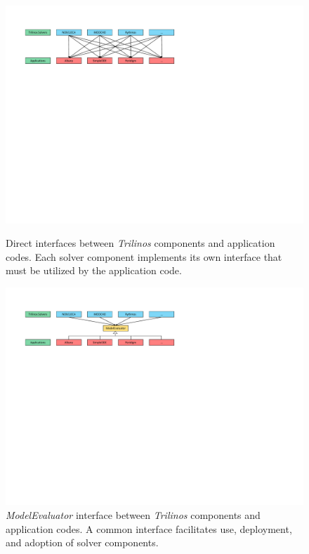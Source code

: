 \documentclass[10pt]{article}
\theoremstyle{plain}
\theoremstyle{definition}
\theoremstyle{remark}
\numberwithin{equation}{section}
\begin{document}
\begin{figure}[htbp]
  \begin{minipage}[b]{\linewidth}
    \centering
    \includegraphics[width=\linewidth]{Interfaces1}
    \caption{Direct interfaces between \emph{Trilinos} components and application codes. Each solver component implements its own interface that must be utilized by the application code.}
    \label{fig:ACInterfaces1}
  \end{minipage}
  \begin{minipage}[b]{\linewidth}
    \centering
    \includegraphics[width=\linewidth]{Interfaces2}
    \caption{\emph{ModelEvaluator} interface between \emph{Trilinos} components and application codes. A common interface facilitates use, deployment, and adoption of solver components.}
    \label{fig:ACInterfaces2}
  \end{minipage}
\end{figure}
\end{document}
